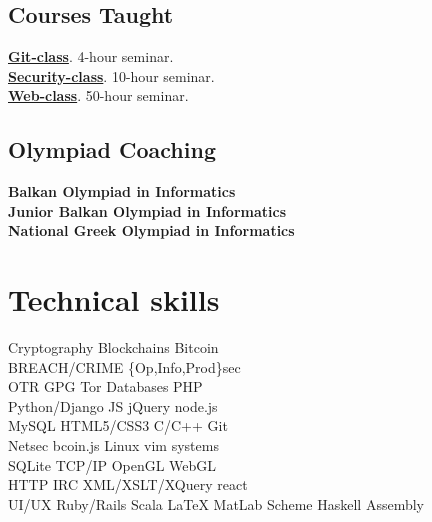 \documentclass[]{deedy-resume-openfont}
\begin{document}
\begin{minipage}[t]{0.33\textwidth}
\subsection{Courses Taught}
\textbf{\href{http://git-class.gr/}{Git-class}}. 4-hour seminar.\\
\textbf{\href{http://security-class.gr/}{Security-class}}. 10-hour seminar.\\
\textbf{\href{https://web-class.gr/}{Web-class}}. 50-hour seminar.\\
\sectionsep

\subsection{Olympiad Coaching}
\textbf{Balkan Olympiad in Informatics}\\
\textbf{Junior Balkan Olympiad in Informatics}\\
\textbf{National Greek Olympiad in Informatics}\\
\sectionsep


\section{Technical skills}
Cryptography \textbullet{}
Blockchains \textbullet{}
Bitcoin\\
BREACH/CRIME \textbullet{}
\{Op,Info,Prod\}sec \\
OTR \textbullet{}
GPG \textbullet{}
Tor \textbullet{}
Databases \textbullet{}
PHP \\
Python/Django \textbullet{}
JS \textbullet{}
jQuery \textbullet{}
node.js \\
MySQL \textbullet
HTML5/CSS3 \textbullet{}
C/C++ \textbullet{}
Git
\\
Netsec \textbullet{}
bcoin.js \textbullet{}
Linux \textbullet{}
vim \textbullet{}
systems \\
SQLite \textbullet{}
TCP/IP \textbullet{}
OpenGL \textbullet{}
WebGL \\
HTTP \textbullet{}
IRC \textbullet{}
XML/XSLT/XQuery \textbullet{}
react
\\
UI/UX \textbullet{}
Ruby/Rails \textbullet{}
Scala \textbullet{}
\LaTeX \textbullet{}
MatLab \textbullet{}
Scheme \textbullet{}
Haskell \textbullet{}
Assembly
\sectionsep

%
%

\end{minipage}
\end{document}
